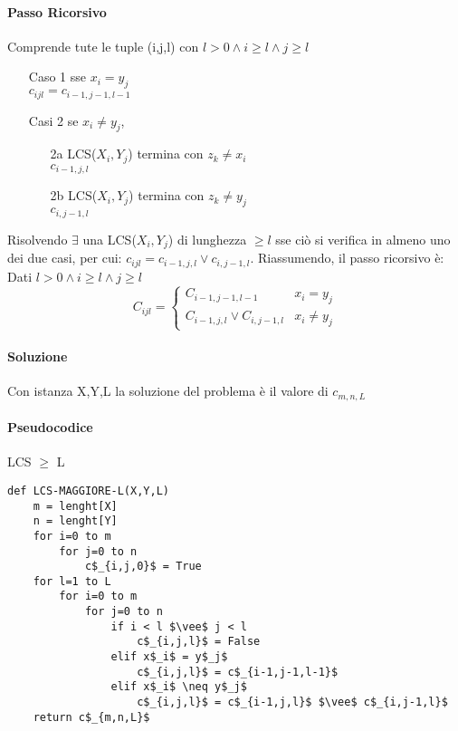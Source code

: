 \paragraph*{Passo Ricorsivo}
Comprende tute le tuple (i,j,l) con $l>0 \wedge i\geq l \wedge j \geq l$
\begin{itemize}
	\item[Caso 1] sse $x_i = y_j$\\ $c_{ijl} = c_{i-1,j-1,l-1}$ %
	\item[Casi 2] se  $x_i \neq y_j$,
		\begin{itemize}
			\item[2a] LCS($X_i,Y_j$) termina con $z_k \neq x_i$ \\ $c_{i-1,j,l}$
			\item[2b] LCS($X_i,Y_j$) termina con $z_k \neq y_j$ \\ $c_{i,j-1,l}$
		\end{itemize}
\end{itemize}
Risolvendo $\exists$ una LCS($X_i,Y_j$) di lunghezza $\geq l$ sse ciò si verifica in almeno uno dei due casi, per cui:
$c_{ijl} = c_{i-1,j,l} \vee c_{i,j-1,l}$.
Riassumendo, il passo ricorsivo è:
Dati $l>0 \wedge i\geq l \wedge j \geq l$
\begin{equation}
	C_{ijl} = \begin{cases}
		C_{i-1,j-1,l-1}              & x_i = y_j    \\
		C_{i-1,j,l} \vee C_{i,j-1,l} & x_i \neq y_j
	\end{cases}
\end{equation}


\paragraph*{Soluzione}
Con istanza X,Y,L la soluzione del problema è il valore di $c_{m,n,L}$

\paragraph*{Pseudocodice} LCS $\geq$ L
\begin{lstlisting}[style=small]
def LCS-MAGGIORE-L(X,Y,L)
	m = lenght[X]
	n = lenght[Y]
	for i=0 to m
		for j=0 to n
			c$_{i,j,0}$ = True
	for l=1 to L
		for i=0 to m
			for j=0 to n
				if i < l $\vee$ j < l
					c$_{i,j,l}$ = False
				elif x$_i$ = y$_j$
					c$_{i,j,l}$ = c$_{i-1,j-1,l-1}$
				elif x$_i$ \neq y$_j$
					c$_{i,j,l}$ = c$_{i-1,j,l}$ $\vee$ c$_{i,j-1,l}$
	return c$_{m,n,L}$
\end{lstlisting}

